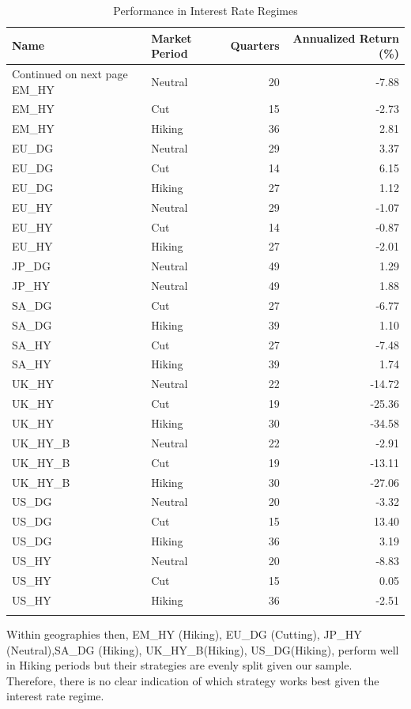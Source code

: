 \documentclass[10pt,preprint, authoryear]{elsarticle}
\numberwithin{equation}{section}
\numberwithin{figure}{section}
\numberwithin{table}{section}
\begin{document}
\begingroup\fontsize{12pt}{13pt}\selectfont
\begin{longtable}{llrr}
  \toprule
Name & Market Period & Quarters & Annualized Return (\%) \\ 
  \hline 
\endhead 
\hline 
{\footnotesize Continued on next page} 
\endfoot 
\endlastfoot 
 \midrule
EM\_HY & Neutral &  20 & -7.88 \\ 
  EM\_HY & Cut &  15 & -2.73 \\ 
  EM\_HY & Hiking &  36 & 2.81 \\ 
  EU\_DG & Neutral &  29 & 3.37 \\ 
  EU\_DG & Cut &  14 & 6.15 \\ 
  EU\_DG & Hiking &  27 & 1.12 \\ 
  EU\_HY & Neutral &  29 & -1.07 \\ 
  EU\_HY & Cut &  14 & -0.87 \\ 
  EU\_HY & Hiking &  27 & -2.01 \\ 
  JP\_DG & Neutral &  49 & 1.29 \\ 
  JP\_HY & Neutral &  49 & 1.88 \\ 
  SA\_DG & Cut &  27 & -6.77 \\ 
  SA\_DG & Hiking &  39 & 1.10 \\ 
  SA\_HY & Cut &  27 & -7.48 \\ 
  SA\_HY & Hiking &  39 & 1.74 \\ 
  UK\_HY & Neutral &  22 & -14.72 \\ 
  UK\_HY & Cut &  19 & -25.36 \\ 
  UK\_HY & Hiking &  30 & -34.58 \\ 
  UK\_HY\_B & Neutral &  22 & -2.91 \\ 
  UK\_HY\_B & Cut &  19 & -13.11 \\ 
  UK\_HY\_B & Hiking &  30 & -27.06 \\ 
  US\_DG & Neutral &  20 & -3.32 \\ 
  US\_DG & Cut &  15 & 13.40 \\ 
  US\_DG & Hiking &  36 & 3.19 \\ 
  US\_HY & Neutral &  20 & -8.83 \\ 
  US\_HY & Cut &  15 & 0.05 \\ 
  US\_HY & Hiking &  36 & -2.51 \\ 
   \bottomrule
\caption{Performance in Interest Rate Regimes\label{tab3}} 
\end{longtable}
\endgroup

Within geographies then, EM\_HY (Hiking), EU\_DG (Cutting), JP\_HY
(Neutral),SA\_DG (Hiking), UK\_HY\_B(Hiking), US\_DG(Hiking), perform
well in Hiking periods but their strategies are evenly split given our
sample. Therefore, there is no clear indication of which strategy works
best given the interest rate regime.
\end{document}
